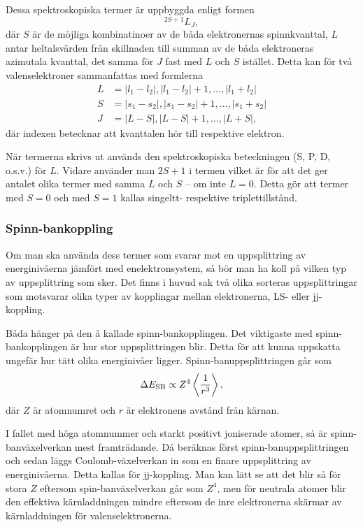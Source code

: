 \documentclass[11pt,a4paper]{article}
\begin{document}
Dessa spektroskopiska termer är uppbyggda enligt formen \cite{Bransden}
\[
^{2S+1}L_J,
\]
där $S$ är de möjliga kombinatinoer av de båda elektronernas
spinnkvanttal, $L$ antar heltalsvärden från skillnaden till summan av
de båda elektroneras azimutala kvanttal, det samma för $J$ fast med
$L$ och $S$ istället. Detta kan för två valenselektroner sammanfattas
med formlerna \cite{Bransden}
\begin{equation*}
\begin{aligned}
L &= |l_1-l_2|, |l_1- l_2|+1, \ldots, |l_1+l_2|\\
S &= |s_1-s_2|, |s_1- s_2|+1, \ldots, |s_1+s_2|\\
J &= |L-S|, |L-S| +1, \ldots, |L+S|,
\end{aligned}
\end{equation*}
där indexen betecknar att kvanttalen hör till respektive elektron.

När termerna skrivs ut används den spektroskopiska beteckningen (S, P,
D, o.s.v.) för $L$. Vidare använder man $2S+1$ i termen vilket är för
att det ger antalet olika termer med samma $L$ och $S$ -- om inte
$L=0$. Detta gör att termer med $S=0$ och med $S=1$ kallas singeltt-
respektive triplettillstånd. 

\subsubsection{Spinn-bankoppling}\label{sec:LS}
Om man ska använda dess termer som svarar mot en uppsplittring av energinivåerna
jämfört med enelektronsystem, så bör man ha koll på vilken typ av uppsplittring
som sker. Det finns i huvud sak två olika sorteras uppsplittringar som motsvarar
olika typer av kopplingar mellan elektronerna, LS- eller jj-koppling. 

Båda hänger på den å kallade spinn-bankopplingen. Det viktigaste med
spinn-bankopplingen är hur stor uppsplittringen blir. Detta för att kunna
uppskatta ungefär hur tätt olika energinivåer ligger. Spinn-banuppsplittringen
går som\cite{Bransden} 
\[
\Delta E_\text{SB} \propto Z^4 \ev{\frac{1}{r^3}},
\]
där $Z$ är atomnumret och $r$ är elektronens avstånd från kärnan.

I fallet med höga atomnummer och starkt positivt joniserade atomer, så är
spinn-banväxelverkan mest framträdande. Då beräknas först
spinn-banuppsplittringen och sedan läggs Coulomb-växelverkan in som en
finare uppsplittring av energinivåerna. Detta kallas för
jj-koppling. Man kan lätt se att det blir så för stora $Z$ eftersom
spin-banväxelverkan går som $Z^4$, men för neutrala atomer blir den
effektiva kärnladdningen mindre eftersom de inre elektronerna skärmar
av kärnladdningen för valenselektronerna. 
\end{document}
